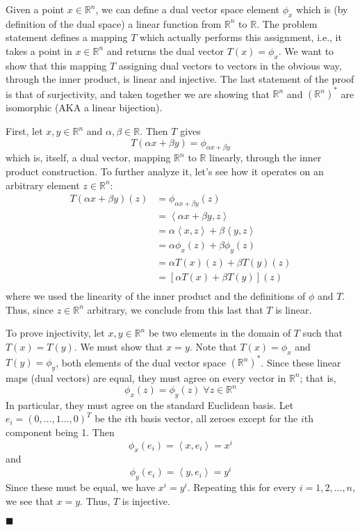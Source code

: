\documentclass[12pt]{article}
\renewcommand{\qed}{\hfill$\blacksquare$}
\renewenvironment{proof}{\begin{addmargin}[1em]{0em}\begin{newproof}}{\end{newproof}\end{addmargin}\qed}
\begin{document}
 \begin{proof}
 Given a point $x\in \mathbb{R}^n$, we can define a dual vector space element $\phi_x$ which is (by definition of the dual space) a linear function from $\mathbb{R}^n$ to $\mathbb{R}$. The problem statement defines a mapping $T$ which actually performs this assignment, i.e., it takes a point in $x \in \mathbb{R}^n$ and returns the dual vector $T\left(x\right) = \phi_x$. We want to show that this mapping $T$ assigning dual vectors to vectors in the obvious way, through the inner product, is linear and injective. The last statement of the proof is that of surjectivity, and taken together we are showing that $\mathbb{R}^n$ and $\left(\mathbb{R}^n\right)^*$ are isomorphic (AKA a linear bijection).
 
 First, let $x,y \in \mathbb{R}^n$ and $\alpha, \beta \in \mathbb{R}$. Then $T$ gives
$$ T\left(\alpha x + \beta y \right) = \phi_{\alpha x + \beta y} $$
which is, itself, a dual vector, mapping $\mathbb{R}^n$ to $\mathbb{R}$ linearly, through the inner product construction. To further analyze it, let's see how it operates on an arbitrary element $z \in \mathbb{R}^n$: 
\begin{equation*}
\begin{split}
T\left(\alpha x + \beta y\right)\left(z\right) & = \phi_{\alpha x + \beta y} \left(z\right) \\
& = \left\langle \alpha x + \beta y, z \right\rangle \\
& = \alpha \left\langle x,z\right\rangle + \beta \left\langle y,z\right\rangle \\
& = \alpha \phi_x \left(z\right) + \beta \phi_y \left(z\right) \\
& = \alpha T\left(x\right) \left(z\right) + \beta T\left(y\right)\left(z\right) \\
& = \left[ \alpha T\left(x\right) + \beta T\left(y\right) \right] \left(z\right) \\
\end{split}
\end{equation*}
where we used the linearity of the inner product and the definitions of $\phi$ and $T$. Thus, since $z\in \mathbb{R}^n$ arbitrary, we conclude from this last that $T$ is linear. 

To prove injectivity, let $x,y\in \mathbb{R}^n$ be two elements in the domain of $T$ such that $T\left(x\right) = T\left(y\right)$. We must show that $x=y$. Note that $T\left(x\right) = \phi_x $ and $T\left(y\right) = \phi_y $, both elements of the dual vector space $\left(\mathbb{R}^n\right)^*$. Since these linear maps (dual vectors) are equal, they must agree on every vector in $\mathbb{R}^n$; that is,
$$ \phi_x \left(z\right) = \phi_y\left(z\right) \; \forall z\in \mathbb{R}^n $$
In particular, they must agree on the standard Euclidean basis. Let $e_i = \left(0,\ldots,1\ldots,0\right)^T$ be the $i$th basis vector, all zeroes except for the $i$th component being 1. Then
$$ \phi_x \left(e_i\right) = \left\langle x, e_i \right\rangle = x^i $$
and 
$$ \phi_y \left(e_i\right) = \left\langle y, e_i \right\rangle = y^i $$
Since these must be equal, we have $x^i = y^i$. Repeating this for every $i = 1,2,\ldots,n$, we see that $x=y$. Thus, $T$ is injective.


\end{proof}
\end{document}
